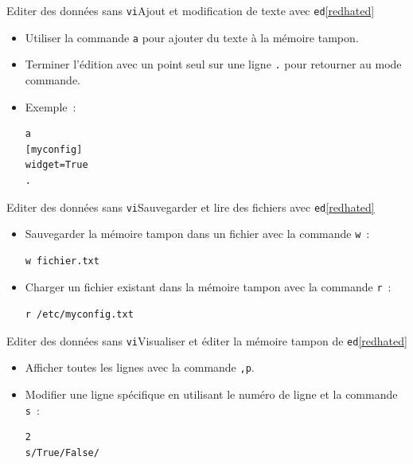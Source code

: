 \documentclass{beamer}
\begin{document}
    \begin{frame}[fragile]{Editer des données sans \lstinline{vi}}{Ajout et modification de texte avec \lstinline{ed}\cref{redhated}}
        \begin{itemize}
            \item Utiliser la commande \lstinline{a} pour ajouter du texte à la mémoire tampon.
            \item Terminer l'édition avec un point seul sur une ligne \lstinline{.} pour retourner au mode commande.
            \item Exemple~:
            \begin{lstlisting}
a
[myconfig]
widget=True
.
            \end{lstlisting}
        \end{itemize}
    \end{frame}

    \begin{frame}[fragile]{Editer des données sans \lstinline{vi}}{Sauvegarder et lire des fichiers avec \lstinline{ed}\cref{redhated}}
        \begin{itemize}
            \item Sauvegarder la mémoire tampon dans un fichier avec la commande \lstinline{w}~:
            \begin{lstlisting}
w fichier.txt
            \end{lstlisting}
            \item Charger un fichier existant dans la mémoire tampon avec la commande \lstinline{r}~:
            \begin{lstlisting}
r /etc/myconfig.txt
            \end{lstlisting}
        \end{itemize}
    \end{frame}

    \begin{frame}[fragile]{Editer des données sans \lstinline{vi}}{Visualiser et éditer la mémoire tampon de \lstinline{ed}\cref{redhated}}
        \begin{itemize}
            \item Afficher toutes les lignes avec la commande \lstinline{,p}.
            \item Modifier une ligne spécifique en utilisant le numéro de ligne et la commande \lstinline{s}~:
            \begin{lstlisting}
2
s/True/False/
            \end{lstlisting}
        \end{itemize}
    \end{frame}
\end{document}
